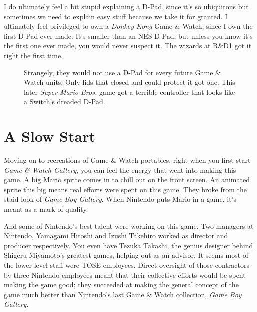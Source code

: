 \documentclass{book}
\begin{document}
I do ultimately feel a bit stupid explaining a D-Pad, since it’s so ubiquitous but sometimes we need to explain easy stuff because we take it for granted. I ultimately feel privileged to own a \emph{Donkey Kong} Game \& Watch, since I own the first D-Pad ever made. It’s smaller than an NES D-Pad, but unless you know it’s the first one ever made, you would never suspect it. The wizards at R\&D1 got it right the first time.\par
\FloatBarrier\vspace{\baselineskip}\begin{figure}[H]\caption*{Strangely, they would not use a D-Pad for every future Game \& Watch units. Only lids that closed and could protect it got one. This later \emph{Super Mario Bros.} game got a terrible controller that looks like a Switch’s dreaded D-Pad.}\end{figure}
\FloatBarrier\section*{A Slow Start}
Moving on to recreations of Game \& Watch portables, right when you first start \emph{Game \& Watch Gallery}, you can feel the energy that went into making this game. A big Mario sprite comes in to chill out on the front screen. An animated sprite this big means real efforts were spent on this game. They broke from the staid look of \emph{Game Boy Gallery}. When Nintendo puts Mario in a game, it’s meant as a mark of quality.\par
And some of Nintendo’s best talent were working on this game. Two managers at Nintendo, Yamagami Hitoshi and Izushi Takehiro worked as director and producer respectively. You even have Tezuka Takashi, the genius designer behind Shigeru Miyamoto’s greatest games, helping out as an advisor. It seems most of the lower level staff were TOSE employees. Direct oversight of those contractors by three Nintendo employees meant that their collective efforts would be spent making the game good; they succeeded at making the general concept of the game much better than Nintendo’s last Game \& Watch collection, \emph{Game Boy Gallery}.\par
\FloatBarrier\vspace{\baselineskip}\begin{figure}[H]\end{figure}
\end{document}
